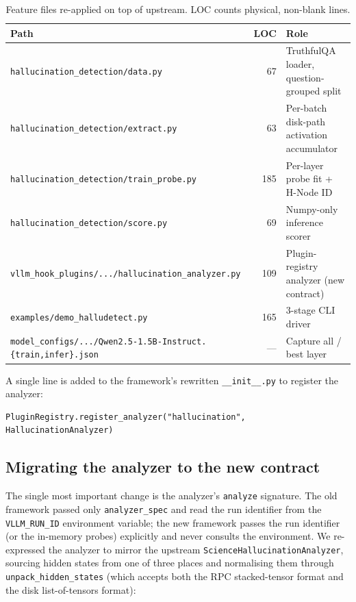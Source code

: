 \documentclass[11pt]{article}
\begin{document}
\begin{table}[h]
\centering
\caption{Feature files re-applied on top of upstream. LOC counts physical, non-blank lines.}
\label{tab:files}
\begin{tabular}{lrl}
\toprule
\textbf{Path} & \textbf{LOC} & \textbf{Role}\\
\midrule
\texttt{hallucination\_detection/data.py}            & 67  & TruthfulQA loader, question-grouped split\\
\texttt{hallucination\_detection/extract.py}         & 63  & Per-batch disk-path activation accumulator\\
\texttt{hallucination\_detection/train\_probe.py}    & 185 & Per-layer probe fit + H-Node ID\\
\texttt{hallucination\_detection/score.py}           & 69  & Numpy-only inference scorer\\
\texttt{vllm\_hook\_plugins/.../hallucination\_analyzer.py} & 109 & Plugin-registry analyzer (new contract)\\
\texttt{examples/demo\_halludetect.py}               & 165 & 3-stage CLI driver\\
\texttt{model\_configs/.../Qwen2.5-1.5B-Instruct.\{train,infer\}.json} & --- & Capture all / best layer\\
\bottomrule
\end{tabular}
\end{table}

A single line is added to the framework's rewritten \texttt{\_\_init\_\_.py} to register the
analyzer:
\begin{lstlisting}[style=py]
PluginRegistry.register_analyzer("hallucination", HallucinationAnalyzer)
\end{lstlisting}

\subsection{Migrating the analyzer to the new contract}\label{sec:migration}
The single most important change is the analyzer's \texttt{analyze} signature. The old
framework passed only \texttt{analyzer\_spec} and read the run identifier from the
\texttt{VLLM\_RUN\_ID} environment variable; the new framework passes the run identifier (or
the in-memory probes) explicitly and never consults the environment. We re-expressed the
analyzer to mirror the upstream \texttt{ScienceHallucinationAnalyzer}, sourcing hidden states
from one of three places and normalising them through \texttt{unpack\_hidden\_states} (which
accepts both the RPC stacked-tensor format and the disk list-of-tensors format):
\end{document}
